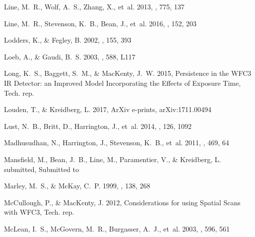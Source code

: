 \documentclass[twocolumn, trackchanges]{aastex61}
\begin{document}
\begin{thebibliography}{}
{Line}, M.~R., {Wolf}, A.~S., {Zhang}, X., {et~al.} 2013, \apj, 775, 137

{Line}, M.~R., {Stevenson}, K.~B., {Bean}, J., {et~al.} 2016, \aj, 152, 203

{Lodders}, K., \& {Fegley}, B. 2002, \icarus, 155, 393

{Loeb}, A., \& {Gaudi}, B.~S. 2003, \apjl, 588, L117

{Long}, K.~S., {Baggett}, S.~M., \& {MacKenty}, J.~W. 2015, {Persistence in the
  WFC3 IR Detector: an Improved Model Incorporating the Effects of Exposure
  Time}, Tech. rep.

{Louden}, T., \& {Kreidberg}, L. 2017, ArXiv e-prints, arXiv:1711.00494

{Lust}, N.~B., {Britt}, D., {Harrington}, J., {et~al.} 2014, \pasp, 126, 1092

{Madhusudhan}, N., {Harrington}, J., {Stevenson}, K.~B., {et~al.} 2011, \nat,
  469, 64

{Mansfield}, M., {Bean}, J.~B., {Line}, M., {Paramentier}, V., \& {Kreidberg},
  L. submitted, Submitted to \apj

{Marley}, M.~S., \& {McKay}, C.~P. 1999, \icarus, 138, 268

{McCullough}, P., \& {MacKenty}, J. 2012, {Considerations for using Spatial
  Scans with WFC3}, Tech. rep.

{McLean}, I.~S., {McGovern}, M.~R., {Burgasser}, A.~J., {et~al.} 2003, \apj,
  596, 561


\end{thebibliography}
\end{document}

